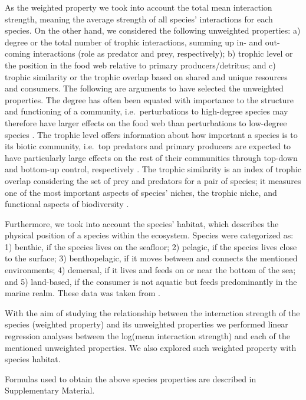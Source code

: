 \documentclass[gc, manuscript]{copernicus}
\begin{document}
As the weighted property we took into account the total mean interaction
strength, meaning the average strength of all species' interactions for
each species. On the other hand, we considered the following unweighted
properties: a) degree or the total number of trophic interactions,
summing up in- and out-coming interactions (role as predator and prey,
respectively); b) trophic level or the position in the food web relative
to primary producers/detritus; and c) trophic similarity or the trophic
overlap based on shared and unique resources and consumers. The
following are arguments to have selected the unweighted properties. The
degree has often been equated with importance to the structure and
functioning of a community, i.e.~perturbations to high-degree species
may therefore have larger effects on the food web than perturbations to
low-degree species \citetext{\citealp{Dunne2002a}; \citealp[references
in][]{Cirtwill2018a}}. The trophic level offers information about how
important a species is to its biotic community, i.e.~top predators and
primary producers are expected to have particularly large effects on the
rest of their communities through top-down and bottom-up control,
respectively \citep[references in][]{Cirtwill2018a}. The trophic
similarity is an index of trophic overlap considering the set of prey
and predators for a pair of species; it measures one of the most
important aspects of species' niches, the trophic niche, and functional
aspects of biodiversity \citep{Martinez1991, Williams2000}.

Furthermore, we took into account the species' habitat, which describes
the physical position of a species within the ecosystem. Species were
categorized as: 1) benthic, if the species lives on the seafloor; 2)
pelagic, if the species lives close to the surface; 3) benthopelagic, if
it moves between and connects the mentioned environments; 4) demersal,
if it lives and feeds on or near the bottom of the sea; and 5)
land-based, if the consumer is not aquatic but feeds predominantly in
the marine realm. These data was taken from \citet{Jacob2011}.

With the aim of studying the relationship between the interaction
strength of the species (weighted property) and its unweighted
properties we performed linear regression analyses between the log(mean
interaction strength) and each of the mentioned unweighted properties.
We also explored such weighted property with species habitat.

Formulas used to obtain the above species properties are described in
Supplementary Material.
\end{document}
